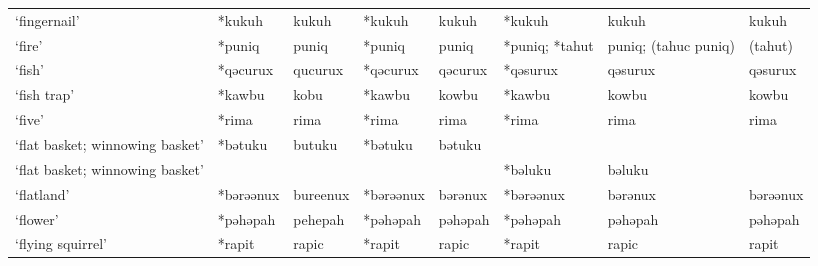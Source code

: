 \begin{landscape}
\begin{longtable}[c]{@{}p{3cm}<{\raggedright}p{2.75cm}<{\raggedright}p{2.75cm}<{\raggedright}p{2.75cm}<{\raggedright}p{2.75cm}<{\raggedright}p{2.75cm}<{\raggedright}p{2.75cm}<{\raggedright}p{2.75cm}<{\raggedright}@{}}
`fingernail'                                         & *kukuh             & kukuh                          & *kukuh             & kukuh                      & *kukuh           & kukuh                    & kukuh                             \\
`fire'                                               & *puniq             & puniq                          & *puniq             & puniq                      & *puniq; *tahut   & puniq; (tahuc puniq)     & (tahut)                           \\
`fish'                                               & *qəcurux           & qucurux                        & *qəcurux           & qəcurux                    & *qəsurux         & qəsurux                  & qəsurux                           \\
`fish trap'                                          & *kawbu             & kobu                           & *kawbu             & kowbu                      & *kawbu           & kowbu                    & kowbu                             \\
`five'                                               & *rima              & rima                           & *rima              & rima                       & *rima            & rima                     & rima                              \\
`flat basket; winnowing basket'                      & *bətuku            & butuku                         & *bətuku            & bətuku                     &                  &                          &                                   \\
`flat basket; winnowing basket'                      &                    &                                &                    &                            & *bəluku          & bəluku                   &                                   \\
`flatland'                                           & *bərəənux          & bureenux                       & *bərəənux          & bərənux                    & *bərəənux        & bərənux                  & bərəənux                          \\
`flower'                                             & *pəhəpah           & pehepah                        & *pəhəpah           & pəhəpah                    & *pəhəpah         & pəhəpah                  & pəhəpah                           \\
`flying squirrel'                                    & *rapit             & rapic                          & *rapit             & rapic                      & *rapit           & rapic                    & rapit                             \\

\end{longtable}
\end{landscape}
